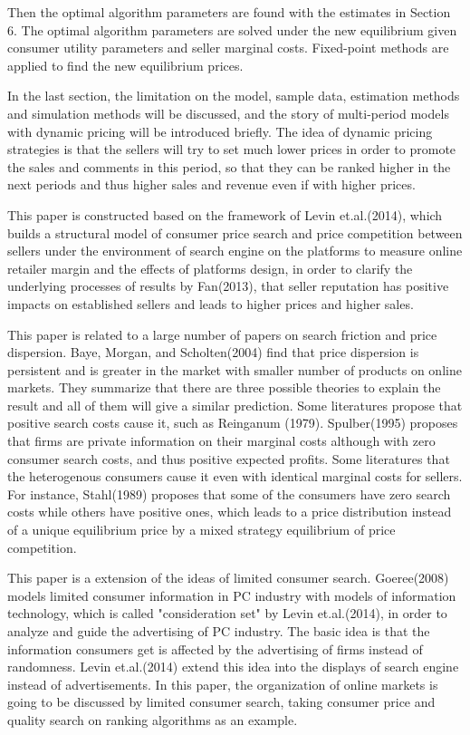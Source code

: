\documentclass{article}
\begin{document}
Then the optimal algorithm parameters are found with the estimates in Section 6. The optimal algorithm parameters are solved under the new equilibrium given consumer utility parameters and seller marginal costs. Fixed-point methods are applied to find the new equilibrium prices. 

In the last section, the limitation on the model, sample data, estimation methods and simulation methods will be discussed, and the story of multi-period models with dynamic pricing will be introduced briefly. The idea of dynamic pricing strategies is that the sellers will try to set much lower prices in order to promote the sales and comments in this period, so that they can be ranked higher in the next periods and thus higher sales and revenue even if with higher prices. 

This paper is constructed based on the framework of Levin et.al.(2014), which builds a structural model of consumer price search and price competition between sellers under the environment of search engine on the platforms to measure online retailer margin and the effects of platforms design, in order to clarify the underlying processes of results by Fan(2013), that seller reputation has positive impacts on established sellers and leads to higher prices and higher sales. 

This paper is related to a large number of papers on search friction and price dispersion. Baye, Morgan, and Scholten(2004) find that price dispersion is persistent and is greater in the market with smaller number of products on online markets. They summarize that there are three possible theories to explain the result and all of them will give a similar prediction. Some literatures propose that positive search costs cause it, such as Reinganum (1979). Spulber(1995) proposes that firms are private information on their marginal costs although with zero consumer search costs, and thus positive expected profits. Some literatures that the heterogenous consumers cause it even with identical marginal costs for sellers. For instance, Stahl(1989) proposes that some of the consumers have zero search costs while others have positive ones, which leads to a price distribution instead of a unique equilibrium price by a mixed strategy equilibrium of price competition. 

This paper is a extension of the ideas of limited consumer search. Goeree(2008) models limited consumer information in PC industry with models of information technology, which is called "consideration set" by Levin et.al.(2014), in order to analyze and guide the advertising of PC industry. The basic idea is that the information consumers get is affected by the advertising of firms instead of randomness. Levin et.al.(2014) extend this idea into the displays of search engine instead of advertisements. In this paper, the organization of online markets is going to be discussed by limited consumer search, taking consumer price and quality search on ranking algorithms as an example. 
\end{document}
